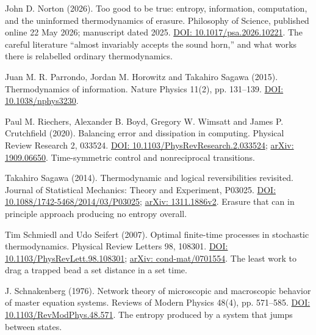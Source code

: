 \documentclass[11pt,twoside]{article}
\theoremstyle{thielethm}
\theoremstyle{thieledef}
\theoremstyle{thieledef}
\theoremstyle{thieledef}
\theoremstyle{thielethm}
\theoremstyle{thieleobs}
\theoremstyle{thielethm}
\begin{document}
\noindent John D. Norton (2026). Too good to be true: entropy, information, computation, and the uninformed thermodynamics of erasure. Philosophy of Science, published online 22 May 2026; manuscript dated 2025. \href{https://doi.org/10.1017/psa.2026.10221}{DOI: 10.1017/psa.2026.10221}. The careful literature ``almost invariably accepts the sound horn,'' and what works there is relabelled ordinary thermodynamics.
\par\medskip

\noindent Juan M. R. Parrondo, Jordan M. Horowitz and Takahiro Sagawa (2015). Thermodynamics of information. Nature Physics 11(2), pp. 131--139. \href{https://doi.org/10.1038/nphys3230}{DOI: 10.1038/nphys3230}.
\par\medskip

\noindent Paul M. Riechers, Alexander B. Boyd, Gregory W. Wimsatt and James P. Crutchfield (2020). Balancing error and dissipation in computing. Physical Review Research 2, 033524. \href{https://doi.org/10.1103/PhysRevResearch.2.033524}{DOI: 10.1103/PhysRevResearch.2.033524}; \href{https://arxiv.org/abs/1909.06650}{arXiv: 1909.06650}. Time-symmetric control and nonreciprocal transitions.
\par\medskip

\noindent Takahiro Sagawa (2014). Thermodynamic and logical reversibilities revisited. Journal of Statistical Mechanics: Theory and Experiment, P03025. \href{https://doi.org/10.1088/1742-5468/2014/03/P03025}{DOI: 10.1088/1742-5468/2014/03/P03025}; \href{https://arxiv.org/abs/1311.1886v2}{arXiv: 1311.1886v2}. Erasure that can in principle approach producing no entropy overall.
\par\medskip

\noindent Tim Schmiedl and Udo Seifert (2007). Optimal finite-time processes in stochastic thermodynamics. Physical Review Letters 98, 108301. \href{https://doi.org/10.1103/PhysRevLett.98.108301}{DOI: 10.1103/PhysRevLett.98.108301}; \href{https://arxiv.org/abs/cond-mat/0701554}{arXiv: cond-mat/0701554}. The least work to drag a trapped bead a set distance in a set time.
\par\medskip

\noindent J. Schnakenberg (1976). Network theory of microscopic and macroscopic behavior of master equation systems. Reviews of Modern Physics 48(4), pp. 571--585. \href{https://doi.org/10.1103/RevModPhys.48.571}{DOI: 10.1103/RevModPhys.48.571}. The entropy produced by a system that jumps between states.
\par\medskip
\end{document}
